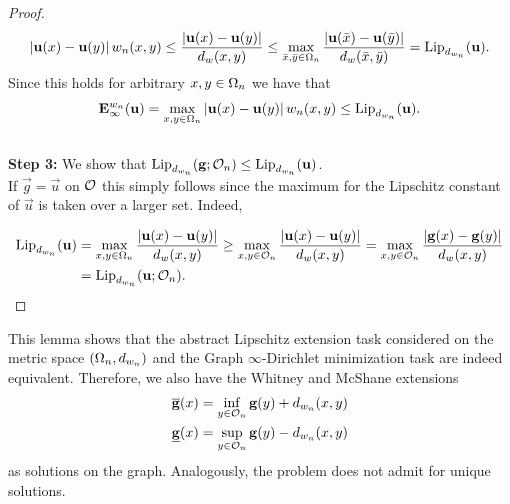 \begin{proof}
%
\begin{align*}
\left|\mathbf{u}(x) - \mathbf{u}(y)\right| w_n(x,y)\leq 
\frac{\left|\mathbf{u}(x) - \mathbf{u}(y)\right|}{d_w(x,y)} \leq 
\max_{\bar{x}, \bar{y}\in\Omega_n}  
\frac{\left|\mathbf{u}(\bar x) - \mathbf{u}(\bar y)\right|}{d_w(\bar x,\bar y)} = \operatorname{Lip}_{d_{w_n}}(\mathbf{u}).
\end{align*}
%
Since this holds for arbitrary $x,y\in\Omega_n$ we have that
%
\begin{align*}
\mathbf{E}^{w_n}_\infty(\mathbf{u}) = \max_{x,y\in\Omega_n} \left|\mathbf{u}(x) - \mathbf{u}(y)\right| w_n(x,y)
\leq
\operatorname{Lip}_{d_{w_n}}(\mathbf{u}).
\end{align*}\\
\noindent%
\textbf{Step 3:} We show that $\operatorname{Lip}_{d_{w_n}}(\mathbf{g};\mathcal{O}_n) \leq \operatorname{Lip}_{d_{w_n}}(\mathbf{u})$.\\
%
If $\vec g = \vec u$ on $\mathcal{O}$ this simply follows since the maximum for the Lipschitz constant of $\vec u$ is taken over a larger set. Indeed,

\begin{align*}
\operatorname{Lip}_{d_{w_n}}(\mathbf{u}) &= 
\max_{x,y\in\Omega_n} \frac{\left|\mathbf{u}(x) - \mathbf{u}(y)\right|}{d_w(x,y)}
\geq 
\max_{x,y\in\mathcal{O}_n} \frac{\left|\mathbf{u}(x) - \mathbf{u}(y)\right|}{d_w(x,y)}
=
\max_{x,y\in\mathcal{O}_n} \frac{\left|\mathbf{g}(x) - \mathbf{g}(y)\right|}{d_w(x,y)}\\
&=
\operatorname{Lip}_{d_{w_n}}(\mathbf{u}; \mathcal{O}_n).
\end{align*}
\end{proof}
%
%
%
\noindent%
This lemma shows that the abstract Lipschitz extension task considered on the metric space $(\Omega_n, d_{w_n})$ and the Graph $\infty$-Dirichlet minimization task are indeed equivalent. Therefore, we also have the Whitney and McShane extensions
%
\begin{align*}
\overline{\mathbf{g}}(x) &= \inf_{y\in\mathcal{O}_n} \mathbf{g} (y) + d_{w_n}(x,y)\\
\underline{\mathbf{g}}(x) &= \sup_{y\in\mathcal{O}_n} \mathbf{g} (y) - d_{w_n}(x,y)
\end{align*}
%
as solutions on the graph. Analogously, the problem does not admit for unique solutions.
%
%
%
